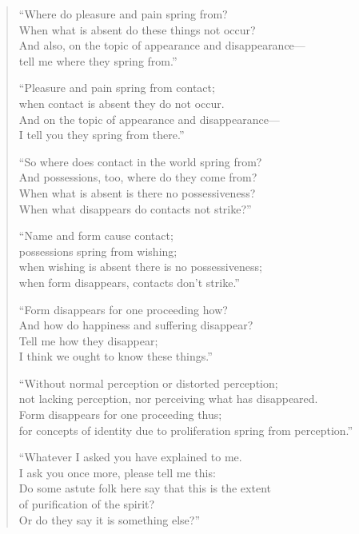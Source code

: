 \documentclass[12pt,openany]{book}%
\begin{document}
\begin{verse}
“Where do pleasure and pain spring from? \\
When what is absent do these things not occur? \\
And also, on the topic of appearance and disappearance—\\
tell me where they spring from.” 

“Pleasure and pain spring from contact; \\
when contact is absent they do not occur. \\
And on the topic of appearance and disappearance—\\
I tell you they spring from there.” 

“So where does contact in the world spring from? \\
And possessions, too, where do they come from? \\
When what is absent is there no possessiveness? \\
When what disappears do contacts not strike?” 

“Name and form cause contact; \\
possessions spring from wishing; \\
when wishing is absent there is no possessiveness; \\
when form disappears, contacts don’t strike.” 

“Form disappears for one proceeding how? \\
And how do happiness and suffering disappear? \\
Tell me how they disappear; \\
I think we ought to know these things.” 

“Without normal perception or distorted perception; \\
not lacking perception, nor perceiving what has disappeared. \\
Form disappears for one proceeding thus; \\
for concepts of identity due to proliferation spring from perception.” 

“Whatever I asked you have explained to me. \\
I ask you once more, please tell me this: \\
Do some astute folk here say that this is the extent \\
of purification of the spirit? \\
Or do they say it is something else?” 


\end{verse}
\end{document}
